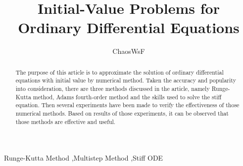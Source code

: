 \documentclass[preprint,12pt]{elsarticle}
\begin{document}
\begin{frontmatter}


\title{Initial-Value Problems for Ordinary Differential Equations}




\author{ChaosWsF}

\address{No.,  University}

\begin{abstract}
The purpose of this article is to approximate the solution of ordinary differential equations with initial value by numerical method. Taken the accuracy and popularity into consideration, there are three methods discussed in the article, namely Runge-Kutta method, Adams fourth-order method and the skills used to solve the stiff equation. Then several experiments have been made to verify the effectiveness of those numerical methods. Based on results of those experiments, it can be observed that those methods are effective and useful.
\end{abstract}

\begin{keyword}
Runge-Kutta Method \sep Multistep Method \sep Stiff ODE


\end{keyword}

\end{frontmatter}
\end{document}
